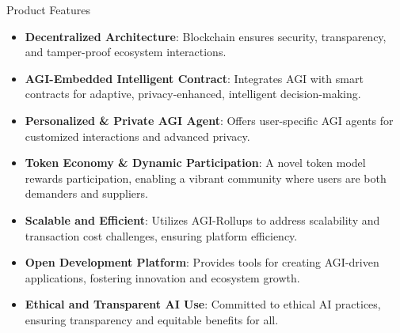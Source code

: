 \documentclass{beamer}
\begin{document}
\begin{frame}{Product Features}
    \begin{itemize}
        \item \textbf{Decentralized Architecture}: Blockchain ensures security, transparency, and tamper-proof ecosystem interactions.
        \item \textbf{AGI-Embedded Intelligent Contract}: Integrates AGI with smart contracts for adaptive, privacy-enhanced, intelligent decision-making.
        \item \textbf{Personalized \& Private AGI Agent}: Offers user-specific AGI agents for customized interactions and advanced privacy.
        \item \textbf{Token Economy \& Dynamic Participation}: A novel token model rewards participation, enabling a vibrant community where users are both demanders and suppliers.
        \item \textbf{Scalable and Efficient}: Utilizes AGI-Rollups to address scalability and transaction cost challenges, ensuring platform efficiency.
        \item \textbf{Open Development Platform}: Provides tools for creating AGI-driven applications, fostering innovation and ecosystem growth.
        \item \textbf{Ethical and Transparent AI Use}: Committed to ethical AI practices, ensuring transparency and equitable benefits for all.
    \end{itemize}
\end{frame}
\end{document}
